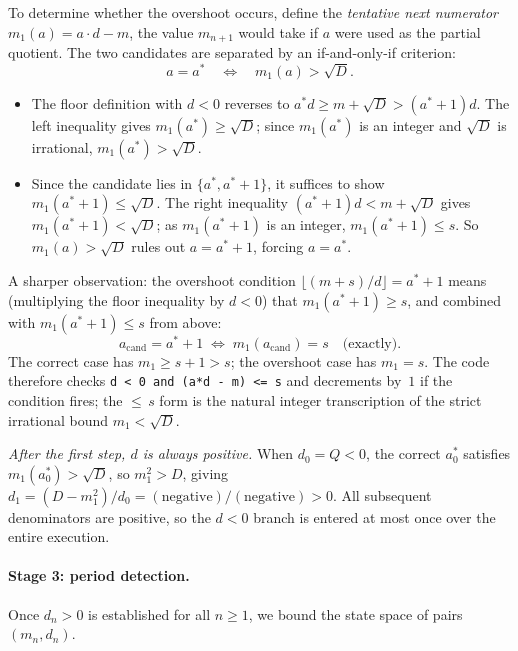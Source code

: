 To determine whether the overshoot occurs, define the \emph{tentative next
numerator} $m_1(a) = a \cdot d - m$, the value $m_{n+1}$ would take if $a$
were used as the partial quotient.  The two candidates are separated by an
if-and-only-if criterion:
\[
  a = a^*
  \quad\Longleftrightarrow\quad
  m_1(a) > \sqrt{D}. \tag{$\star$}
\]
\begin{itemize}
  \item[$({\Rightarrow})$] The floor definition with $d < 0$ reverses to
    $a^*d \geq m + \sqrt{D} > (a^*+1)d$.  The left inequality gives
    $m_1(a^*) \geq \sqrt{D}$; since $m_1(a^*)$ is an integer and $\sqrt{D}$
    is irrational, $m_1(a^*) > \sqrt{D}$.
  \item[$({\Leftarrow})$] Since the candidate lies in $\{a^*, a^*+1\}$, it
    suffices to show $m_1(a^*+1) \leq \sqrt{D}$.  The right inequality
    $(a^*+1)d < m + \sqrt{D}$ gives $m_1(a^*+1) < \sqrt{D}$; as
    $m_1(a^*+1)$ is an integer, $m_1(a^*+1) \leq s$.  So $m_1(a) > \sqrt{D}$
    rules out $a = a^*+1$, forcing $a = a^*$.
\end{itemize}
A sharper observation: the overshoot condition
$\lfloor(m+s)/d\rfloor = a^*+1$ means (multiplying the floor inequality by
$d < 0$) that $m_1(a^*+1) \geq s$, and combined with $m_1(a^*+1) \leq s$
from above:
\[
  a_{\mathrm{cand}} = a^*+1 \;\Longleftrightarrow\;
  m_1(a_{\mathrm{cand}}) = s \quad\text{(exactly)}.
\]
The correct case has $m_1 \geq s+1 > s$; the overshoot case has $m_1 = s$.
The code therefore checks \texttt{d < 0 and (a*d - m) <= s} and decrements
by~$1$ if the condition fires; the ${\leq}\,s$ form is the natural integer
transcription of the strict irrational bound $m_1 < \sqrt{D}$.

\emph{After the first step, $d$ is always positive.}
When $d_0 = Q < 0$, the correct $a_0^*$ satisfies $m_1(a_0^*) > \sqrt{D}$,
so $m_1^2 > D$, giving
$d_1 = (D - m_1^2)/d_0 = (\text{negative})/(\text{negative}) > 0$.
All subsequent denominators are positive, so the $d < 0$ branch is entered
at most once over the entire execution.

\paragraph{Stage 3: period detection.}
Once $d_n > 0$ is established for all $n \geq 1$, we bound the state space
of pairs $(m_n, d_n)$.

